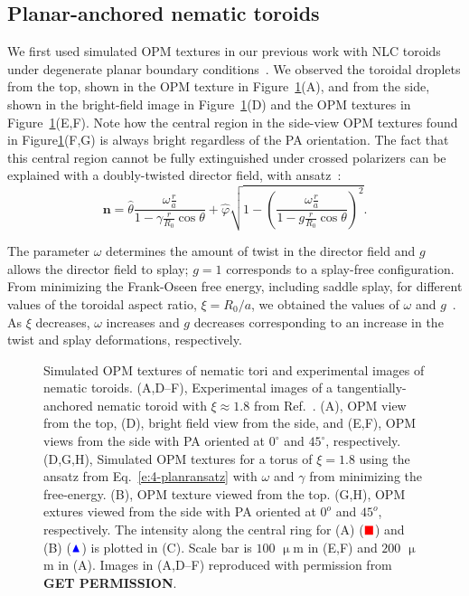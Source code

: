 \subsection{Planar-anchored nematic toroids}
We first used simulated OPM textures in our previous work with NLC toroids under degenerate planar boundary conditions~\cite{RN46}.
We observed the toroidal droplets from the top, shown in the OPM texture in Figure~\ref{f:4-PlanarTorusComparison}(A), and from the side, shown in the bright-field image in Figure~\ref{f:4-PlanarTorusComparison}(D) and the OPM textures in Figure~\ref{f:4-PlanarTorusComparison}(E,F).
Note how the central region in the side-view OPM textures found in Figure\ref{f:4-PlanarTorusComparison}(F,G) is always bright regardless of the PA orientation.
The fact that this central region cannot be fully extinguished under crossed polarizers can be explained with a doubly-twisted director field, with ansatz~\cite{RN46}:
\begin{equation}\label{e:4-planransatz}
\mathbf{n} = \hat{\theta}\frac{\omega \frac{r}{a}}{1-\gamma \frac{r}{R_0} \cos \theta} + \hat{\varphi}\sqrt{1 - \left ( \frac{\omega \frac{r}{a}}{1-g \frac{r}{R_0} \cos \theta} \right )^2 }.
\end{equation}

The parameter $\omega$ determines the amount of twist in the director field and $g$ allows the director field to splay; $g=1$ corresponds to a splay-free configuration.
From minimizing the Frank-Oseen free energy, including saddle splay, for different values of the toroidal aspect ratio, $\xi = R_0/a$, we obtained the values of $\omega$ and $g$~\cite{RN46}.
As $\xi$ decreases, $\omega$ increases and $g$ decreases corresponding to an increase in the twist and splay deformations, respectively.
\begin{figure}
\centering
\caption{Simulated OPM textures of nematic tori and experimental images of nematic toroids. (A,D--F), Experimental images of a tangentially-anchored nematic toroid with $\xi \approx 1.8$ from Ref.~\cite{RN46}.
(A), OPM view from the top, (D), bright field view from the side, and (E,F), OPM views from the side with PA oriented at $0^{\circ}$ and $45^{\circ}$, respectively.
(D,G,H), Simulated OPM textures for a torus of $\xi = 1.8$ using the ansatz from Eq.~\ref{e:4-planransatz} with $\omega$ and $\gamma$ from minimizing the free-energy.
(B), OPM texture viewed from the top.
(G,H), OPM extures viewed from the side with PA oriented at $0^o$ and $45^o$, respectively.
The intensity along the central ring for (A) ($\color{red}\blacksquare$) and (B) ($\color{blue}\blacktriangle$) is plotted in (C).
Scale bar is $100$ $\upmu$m in (E,F) and $200$ $\upmu$m in (A).
Images in (A,D--F) reproduced with permission from {\bf GET PERMISSION}.}\label{f:4-PlanarTorusComparison}
\end{figure}

